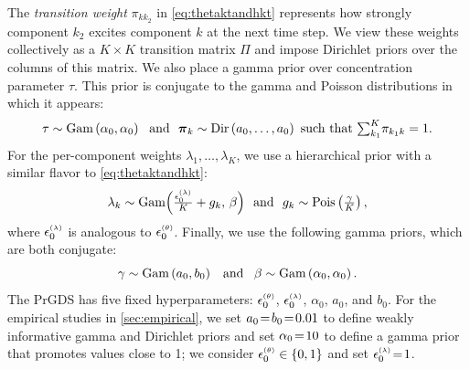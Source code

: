 \documentclass{article}
\begin{document}
The \emph{transition weight} $\pi_{kk_2}$ in \cref{eq:thetaktandhkt} represents how strongly component $k_2$ excites component $k$ at the next time step. We view these weights collectively as a $K \!\times\! K$ transition matrix $\Pi$ and impose Dirichlet priors over the columns of this matrix. We also place a gamma prior over concentration parameter $\tau$. This prior is conjugate to the gamma and Poisson distributions in which it appears:~
\begin{equation}
\tau \sim \Gam{\alpha_0, \alpha_0} \,\,\textrm{ and }\,\,
\boldsymbol{\pi}_k \sim \textrm{Dir}\left(a_0,\dots,a_0\right) \textrm{ such that }\mathsmaller{\sum_{k_1}}^K \pi_{k_1k}=1.
\end{equation}
For the per-component weights $\lambda_1, \ldots, \lambda_K$, we use a hierarchical prior with a similar flavor to \cref{eq:thetaktandhkt}:~
\begin{equation}
\label{eq:lambdakandgk}
\lambda_k \sim \textrm{Gam}\Big(\tfrac{\epslambda}{K} + g_k,\, \beta\Big) \,\,\textrm{ and }\,\,g_k \sim \Pois{\tfrac{\gamma}{K}},
%
\end{equation}
where $\epslambda$ is analogous to $\epstheta$. Finally, we use the following gamma priors, which are both conjugate:~
\begin{equation}
\gamma \sim \textrm{Gam}\left( a_0,b_0 \right) \,\,\,\textrm{ and }\,\,\, \beta \sim \textrm{Gam}\left( \alpha_0, \alpha_0 \right).
\end{equation}
The PrGDS has five fixed hyperparameters: $\epstheta$, $\epslambda$, $\alpha_0$, $a_0$, and $b_0$. For the empirical studies in \cref{sec:empirical}, we set $a_0\!=\! b_0 \!=\! 0.01$ to define weakly informative gamma and Dirichlet priors and set $\alpha_0 \!=\! 10$ to define a gamma prior that promotes values close to 1; we consider $\epstheta \in \{0,1\}$ and set $\epslambda \teq 1$.~
\end{document}

